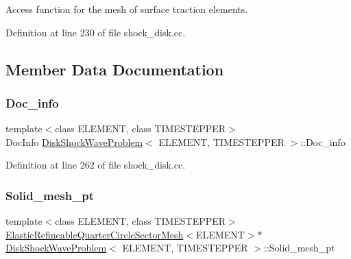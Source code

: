 Access function for the mesh of surface traction elements. 



Definition at line 230 of file shock\+\_\+disk.\+cc.



\subsection{Member Data Documentation}
\mbox{\label{classDiskShockWaveProblem_a8e445e31a1067ebbd3bd667cc02e8662}} 
\subsubsection{\texorpdfstring{Doc\+\_\+info}{Doc\_info}}
{\footnotesize\ttfamily template$<$class E\+L\+E\+M\+E\+NT, class T\+I\+M\+E\+S\+T\+E\+P\+P\+ER$>$ \\
Doc\+Info \hyperlink{classDiskShockWaveProblem}{Disk\+Shock\+Wave\+Problem}$<$ E\+L\+E\+M\+E\+NT, T\+I\+M\+E\+S\+T\+E\+P\+P\+ER $>$\+::Doc\+\_\+info\hspace{0.3cm}{\ttfamily [private]}}



Definition at line 262 of file shock\+\_\+disk.\+cc.

\mbox{\label{classDiskShockWaveProblem_a6efbcb695e829d63f810a7a9bb5a81a4}} 
\subsubsection{\texorpdfstring{Solid\+\_\+mesh\+\_\+pt}{Solid\_mesh\_pt}}
{\footnotesize\ttfamily template$<$class E\+L\+E\+M\+E\+NT, class T\+I\+M\+E\+S\+T\+E\+P\+P\+ER$>$ \\
\hyperlink{classElasticRefineableQuarterCircleSectorMesh}{Elastic\+Refineable\+Quarter\+Circle\+Sector\+Mesh}$<$E\+L\+E\+M\+E\+NT$>$$\ast$ \hyperlink{classDiskShockWaveProblem}{Disk\+Shock\+Wave\+Problem}$<$ E\+L\+E\+M\+E\+NT, T\+I\+M\+E\+S\+T\+E\+P\+P\+ER $>$\+::Solid\+\_\+mesh\+\_\+pt\hspace{0.3cm}{\ttfamily [private]}}



